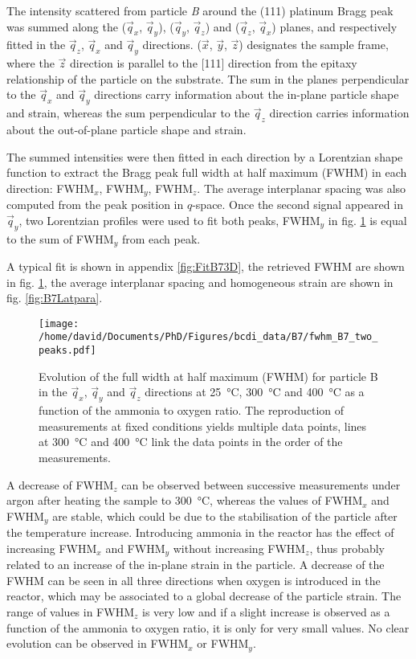 The intensity scattered from particle \textit{B} around the (111) platinum Bragg peak was summed along the ($\vec{q}_x$, $\vec{q}_y$), ($\vec{q}_y$, $\vec{q}_z$) and ($\vec{q}_z$, $\vec{q}_x$) planes, and respectively fitted in the $\vec{q}_z$, $\vec{q}_x$ and $\vec{q}_y$ directions.
($\vec{x}$, $\vec{y}$, $\vec{z}$) designates the sample frame, where the $\vec{z}$ direction is parallel to the [111] direction from the epitaxy relationship of the particle on the substrate.
The sum in the planes perpendicular to the $\vec{q}_x$ and $\vec{q}_y$ directions carry information about the in-plane particle shape and strain, whereas the sum perpendicular to the $\vec{q}_z$ direction carries information about the out-of-plane particle shape and strain.

The summed intensities were then fitted in each direction by a Lorentzian shape function to extract the Bragg peak full width at half maximum (FWHM) in each direction: FWHM$_x$, FWHM$_y$, FWHM$_z$.
The average interplanar spacing was also computed from the peak position in $q$-space.
Once the second signal appeared in $\vec{q}_y$, two Lorentzian profiles were used to fit both peaks, FWHM$_y$ in fig. \ref{fig:B7FWHM} is equal to the sum of FWHM$_y$ from each peak.

A typical fit is shown in appendix \ref{fig:FitB73D}, the retrieved FWHM are shown in fig. \ref{fig:B7FWHM}, the average interplanar spacing and homogeneous strain are shown in fig. \ref{fig:B7Latpara}.

\begin{figure}[!htb]
    \centering
    \texttt{[image: /home/david/Documents/PhD/Figures/bcdi\_data/B7/fwhm\_B7\_two\_peaks.pdf]}
    \caption{
        Evolution of the full width at half maximum (FWHM) for particle B in the $\vec{q}_x$, $\vec{q}_y$ and $\vec{q}_z$ directions at \qty{25}{\degreeCelsius}, \qty{300}{\degreeCelsius} and \qty{400}{\degreeCelsius} as a function of the ammonia to oxygen ratio.
        The reproduction of measurements at fixed conditions yields multiple data points, lines at \qty{300}{\degreeCelsius} and \qty{400}{\degreeCelsius} link the data points in the order of the measurements.
    }
    \label{fig:B7FWHM}
\end{figure}

A decrease of FWHM$_z$ can be observed between successive measurements under argon after heating the sample to \qty{300}{\degreeCelsius}, whereas the values of FWHM$_x$ and FWHM$_y$ are stable, which could be due to the stabilisation of the particle after the temperature increase.
Introducing ammonia in the reactor has the effect of increasing FWHM$_x$ and FWHM$_y$ without increasing FWHM$_z$, thus probably related to an increase of the in-plane strain in the particle.
A decrease of the FWHM can be seen in all three directions when oxygen is introduced in the reactor, which may be associated to a global decrease of the particle strain.
The range of values in FWHM$_z$ is very low and if a slight increase is observed as a function of the ammonia to oxygen ratio, it is only for very small values.
No clear evolution can be observed in FWHM$_x$ or FWHM$_y$.

